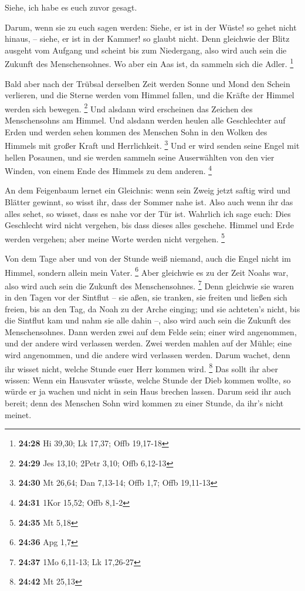  Siehe, ich habe es euch zuvor gesagt.

 Darum, wenn sie zu euch sagen werden: Siehe, er ist in
der Wüste! so gehet nicht hinaus, -- siehe, er ist in der Kammer! so
glaubt nicht.  Denn gleichwie der Blitz ausgeht vom
Aufgang und scheint bis zum Niedergang, also wird auch sein die Zukunft
des Menschensohnes.  Wo aber ein Aas ist, da sammeln sich
die Adler. \footnote{\textbf{24:28} Hi 39,30; Lk 17,37; Offb 19,17-18}

 Bald aber nach der Trübsal derselben Zeit werden Sonne
und Mond den Schein verlieren, und die Sterne werden vom Himmel fallen,
und die Kräfte der Himmel werden sich bewegen. \footnote{\textbf{24:29}
  Jes 13,10; 2Petr 3,10; Offb 6,12-13}  Und alsdann wird
erscheinen das Zeichen des Menschensohns am Himmel. Und alsdann werden
heulen alle Geschlechter auf Erden und werden sehen kommen des Menschen
Sohn in den Wolken des Himmels mit großer Kraft und Herrlichkeit.
\footnote{\textbf{24:30} Mt 26,64; Dan 7,13-14; Offb 1,7; Offb 19,11-13}
 Und er wird senden seine Engel mit hellen Posaunen, und
sie werden sammeln seine Auserwählten von den vier Winden, von einem
Ende des Himmels zu dem anderen. \footnote{\textbf{24:31} 1Kor 15,52;
  Offb 8,1-2}

 An dem Feigenbaum lernet ein Gleichnis: wenn sein Zweig
jetzt saftig wird und Blätter gewinnt, so wisst ihr, dass der Sommer
nahe ist.  Also auch wenn ihr das alles sehet, so wisset,
dass es nahe vor der Tür ist.  Wahrlich ich sage euch:
Dies Geschlecht wird nicht vergehen, bis dass dieses alles geschehe.
 Himmel und Erde werden vergehen; aber meine Worte werden
nicht vergehen. \footnote{\textbf{24:35} Mt 5,18}

 Von dem Tage aber und von der Stunde weiß niemand, auch
die Engel nicht im Himmel, sondern allein mein Vater. \footnote{\textbf{24:36}
  Apg 1,7}  Aber gleichwie es zu der Zeit Noahs war, also
wird auch sein die Zukunft des Menschensohnes. \footnote{\textbf{24:37}
  1Mo 6,11-13; Lk 17,26-27}  Denn gleichwie sie waren in
den Tagen vor der Sintflut -- sie aßen, sie tranken, sie freiten und
ließen sich freien, bis an den Tag, da Noah zu der Arche einging;
 und sie achteten's nicht, bis die Sintflut kam und nahm
sie alle dahin --, also wird auch sein die Zukunft des Menschensohnes.
 Dann werden zwei auf dem Felde sein; einer wird
angenommen, und der andere wird verlassen werden.  Zwei
werden mahlen auf der Mühle; eine wird angenommen, und die andere wird
verlassen werden.  Darum wachet, denn ihr wisset nicht,
welche Stunde euer Herr kommen wird. \footnote{\textbf{24:42} Mt 25,13}
 Das sollt ihr aber wissen: Wenn ein Hausvater wüsste,
welche Stunde der Dieb kommen wollte, so würde er ja wachen und nicht in
sein Haus brechen lassen.  Darum seid ihr auch bereit;
denn des Menschen Sohn wird kommen zu einer Stunde, da ihr's nicht
meinet.

